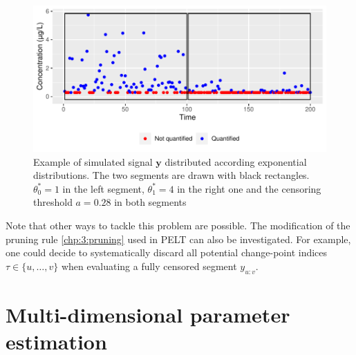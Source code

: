 \begin{figure}[ht]
    \centering
    \includegraphics{figs/Chap4/theta_max_ex.pdf}
    \caption{Example of simulated signal $\bm y$ distributed according exponential distributions. The two segments are drawn with black rectangles. $\theta^*_0 = 1$ in the left segment, $\theta^*_1 = 4$ in the right one and the censoring threshold $a = 0.28$ in both segments}
    \label{fig:theta_max}
\end{figure}

Note that other ways to tackle this problem are possible. The modification of the pruning rule \eqref{chp:3:pruning} used in PELT can also be investigated. For example, one could decide to systematically discard all potential change-point indices $\tau \in \{u,\dots,v\}$ when evaluating a fully censored segment $y_{u:v}$.  

\section{Multi-dimensional parameter estimation}\label{chp:4:3}



